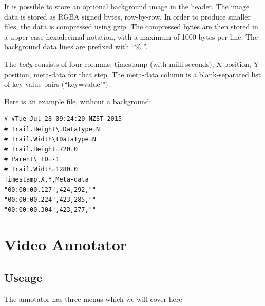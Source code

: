 \documentclass[a4paper]{book}
\begin{document}
It is possible to store an optional background image in the header. The image
data is stored as RGBA signed bytes, row-by-row. In order to produce smaller
files, the data is compressed using gzip\cite{gzip}. The compressed bytes are
then stored in a upper-case hexadecimal notation, with a maximum of 1000 bytes
per line. The background data lines are prefixed with ``\% ''.

The \textit{body} consists of four columns: timestamp (with milli-seconds), X position,
Y position, meta-data for that step. The meta-data column is a blank-separated list of
key-value pairs (``key=value"").

Here is an example file, without a background:

\begin{verbatim}
# #Tue Jul 28 09:24:20 NZST 2015
# Trail.Height\tDataType=N
# Trail.Width\tDataType=N
# Trail.Height=720.0
# Parent\ ID=-1
# Trail.Width=1280.0
Timestamp,X,Y,Meta-data
"00:00:00.127",424,292,""
"00:00:00.224",423,285,""
"00:00:00.304",423,277,""
\end{verbatim}


\chapter{Video Annotator}
\section{Useage}
The annotator has three menus which we will cover here


\end{document}
